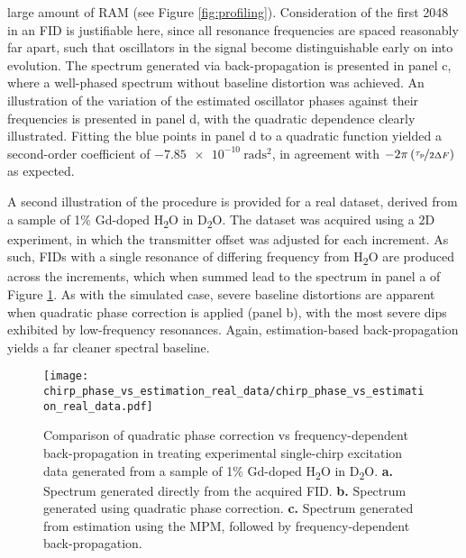 large amount of \ac{RAM} (see Figure \ref{fig:profiling}). Consideration of the
first 2048 in an \ac{FID} is justifiable here, since all resonance frequencies
are spaced reasonably far apart, such that oscillators in the signal become
distinguishable early on into evolution. The spectrum generated via
back-propagation is presented in panel c, where a well-phased spectrum without
baseline distortion was achieved. An illustration of the variation of the
estimated oscillator phases against their frequencies is presented in panel d,
with the quadratic dependence clearly illustrated. Fitting the blue points in
panel d to a quadratic function yielded a second-order coefficient of
$\qty{-7.85e-10}{\radian\second\squared}$, in agreement with $-2 \pi
\left(\nicefrac{\tau_{\text{p}}}{2 \Updelta F}\right)$ as expected.

A second illustration of the procedure is provided for a real dataset, derived
from a sample of 1\% Gd-doped H\textsubscript{2}O in D\textsubscript{2}O.
The dataset was acquired using a \ac{2D} experiment, in which the transmitter
offset was adjusted for each increment. As such, \acp{FID} with a single
resonance of differing frequency from H\textsubscript{2}O are produced across
the increments, which when summed lead to the spectrum in panel a of Figure
\ref{fig:bbqchili-real}. As with the simulated case, severe baseline
distortions are apparent when quadratic phase correction is applied (panel b),
with the most severe dips exhibited by low-frequency resonances. Again, estimation-based back-propagation yields a far cleaner spectral baseline.
\begin{figure}
    \centering
    \texttt{[image: chirp\_phase\_vs\_estimation\_real\_data/chirp\_phase\_vs\_estimation\_real\_data.pdf]}
    \caption[
        Comparison of quadratic phase correction vs frequency-dependent
        back-propagation in treating experimental single-chirp excitation data
        generated from a sample of Gd-doped H\textsubscript{2}O in
        D\textsubscript{2}O.
    ]{
        Comparison of quadratic phase correction vs frequency-dependent
        back-propagation in treating experimental single-chirp excitation data
        generated from a sample of 1\% Gd-doped H\textsubscript{2}O in
        D\textsubscript{2}O.
        \textbf{a.} Spectrum generated directly from the acquired \ac{FID}.
        \textbf{b.} Spectrum generated using quadratic phase correction.
        \textbf{c.} Spectrum generated from estimation using the \ac{MPM},
        followed by frequency-dependent back-propagation.
    }
    \label{fig:bbqchili-real}
\end{figure}
